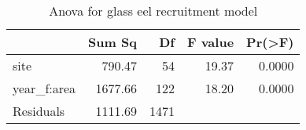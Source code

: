\begin{table}[htbp]
\centering
\caption[table_anova]{Anova for glass eel recruitment model} 
\begin{tabularx}{0.8\textwidth}{lrrrr}
  \hline
 & Sum Sq & Df & F value & Pr(>F) \\ 
  \hline
site & 790.47 & 54 & 19.37 & 0.0000 \\ 
  year\_f:area & 1677.66 & 122 & 18.20 & 0.0000 \\ 
  Residuals & 1111.69 & 1471 &  &  \\ 
   \hline
\end{tabularx}
\end{table}
